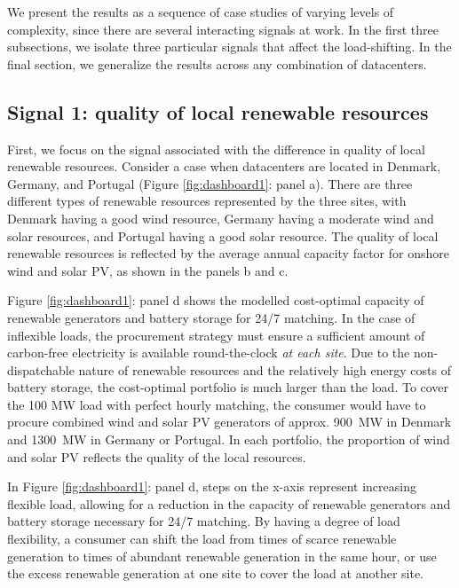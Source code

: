 %

We present the results as a sequence of case studies of varying levels of complexity, since there are several interacting signals at work. In the first three subsections, we isolate three particular signals that affect the load-shifting. In the final section, we generalize the results across any combination of datacenters.

\subsection{Signal 1: quality of local renewable resources}

First, we focus on the signal associated with the difference in quality of local renewable resources. Consider a case when datacenters are located in Denmark, Germany, and Portugal (Figure \ref{fig:dashboard1}: panel a). There are three different types of renewable resources represented by the three sites, with Denmark having a good wind resource, Germany having a moderate wind and solar resources, and Portugal having a good solar resource. The quality of local renewable resources is reflected by the average annual capacity factor for onshore wind and solar PV, as shown in the panels b and c.

Figure \ref{fig:dashboard1}: panel d shows the modelled cost-optimal capacity of renewable generators and battery storage for 24/7 matching. In the case of inflexible loads, the procurement strategy must ensure a sufficient amount of carbon-free electricity is available round-the-clock \textit{at each site}. Due to the non-dispatchable nature of renewable resources and the relatively high energy costs of battery storage, the cost-optimal portfolio is much larger than the load. To cover the 100 MW load with perfect hourly matching, the consumer would have to procure combined wind and solar PV generators of approx. 900~MW in Denmark and 1300~MW in Germany or Portugal. In each portfolio, the proportion of wind and solar PV reflects the quality of the local resources.

In Figure \ref{fig:dashboard1}: panel d, steps on the x-axis represent increasing flexible load, allowing for a reduction in the capacity of renewable generators and battery storage necessary for 24/7 matching. By having a degree of load flexibility, a consumer can shift the load from times of scarce renewable generation to times of abundant renewable generation in the same hour, or use the excess renewable generation at one site to cover the load at another site.

